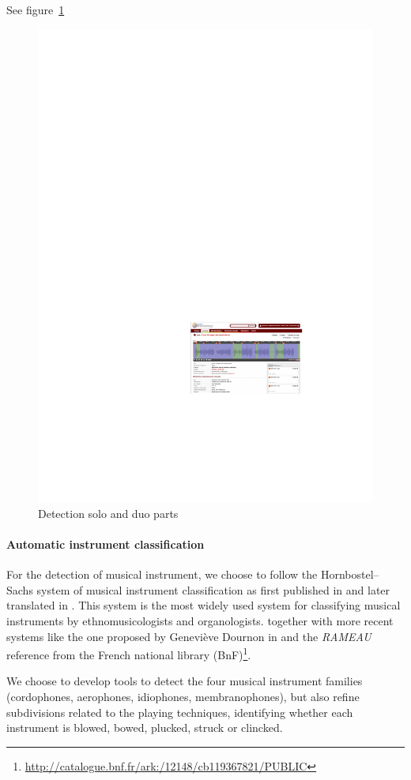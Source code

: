 \documentclass{sig-alternate}
\begin{document}
See figure~\ref{fig:Monopoly}
\begin{figure}[htb]
  \centering
\includegraphics[width=0.7\linewidth]{img/SOLO_DUOdetection.pdf} 
 \caption{Detection solo and duo parts}
  \label{fig:Monopoly}
\end{figure}


\paragraph{Automatic instrument classification}
For the detection of musical instrument, we choose to follow the Hornbostel–Sachs system of musical instrument classification as first published in \cite{taxonomy_sachs2} and later translated in \cite{taxonomy_sachs}. This system is the most widely used system for classifying musical instruments by ethnomusicologists and organologists. together with more recent systems like the one proposed by Geneviève Dournon in \cite{Dournon92} and the \emph{RAMEAU} reference from the French national library (BnF)\footnote{\url{http://catalogue.bnf.fr/ark:/12148/cb119367821/PUBLIC}}.

We choose to develop tools to detect the four musical instrument families (cordophones, aerophones, idiophones, membranophones), but also refine subdivisions related to the playing techniques, identifying whether each instrument is blowed, bowed, plucked, struck or clincked.
\end{document}
